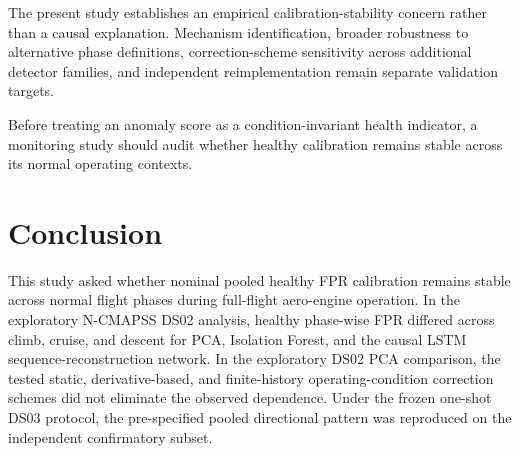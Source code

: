 \documentclass[10pt,twocolumn]{article}
\begin{document}
The present study establishes an empirical calibration-stability concern rather than a causal explanation. Mechanism identification, broader robustness to alternative phase definitions, correction-scheme sensitivity across additional detector families, and independent reimplementation remain separate validation targets.

Before treating an anomaly score as a condition-invariant health indicator, a monitoring study should audit whether healthy calibration remains stable across its normal operating contexts.

\section{Conclusion}\label{conclusion}

This study asked whether nominal pooled healthy FPR calibration remains stable across normal flight phases during full-flight aero-engine operation. In the exploratory N-CMAPSS DS02 analysis, healthy phase-wise FPR differed across climb, cruise, and descent for PCA, Isolation Forest, and the causal LSTM sequence-reconstruction network. In the exploratory DS02 PCA comparison, the tested static, derivative-based, and finite-history operating-condition correction schemes did not eliminate the observed dependence. Under the frozen one-shot DS03 protocol, the pre-specified pooled directional pattern was reproduced on the independent confirmatory subset.
\end{document}
